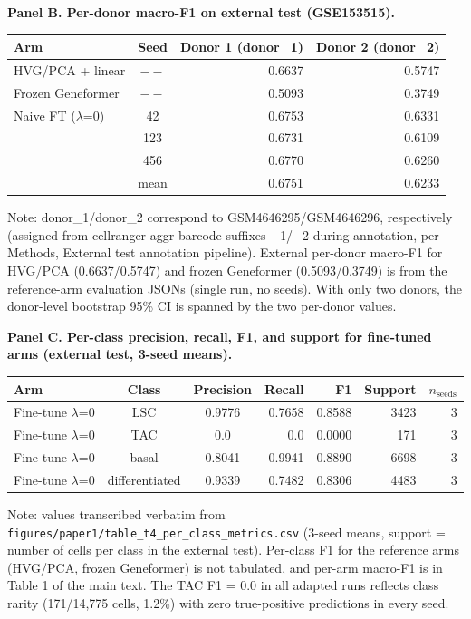 \documentclass[12pt,a4paper]{article}
\begin{document}
\textbf{Panel B. Per-donor macro-F1 on external test (GSE153515).}

\begingroup
\small
\begin{tabular}{lcrr}
\toprule
Arm & Seed & Donor 1 (donor\_1) & Donor 2 (donor\_2)\\
\midrule
HVG/PCA + linear & $--$ & 0.6637 & 0.5747\\
Frozen Geneformer & $--$ & 0.5093 & 0.3749\\
Naive FT ($\lambda$=0) & 42 & 0.6753 & 0.6331\\
 & 123 & 0.6731 & 0.6109\\
 & 456 & 0.6770 & 0.6260\\
 & mean & 0.6751 & 0.6233\\
\bottomrule
\end{tabular}
\endgroup

Note: donor\_1/donor\_2 correspond to GSM4646295/GSM4646296, respectively (assigned from cellranger aggr barcode suffixes $-$1/$-$2 during annotation, per Methods, External test annotation pipeline). External per-donor macro-F1 for HVG/PCA (0.6637/0.5747) and frozen Geneformer (0.5093/0.3749) is from the reference-arm evaluation JSONs (single run, no seeds). With only two donors, the donor-level bootstrap 95\% CI is spanned by the two per-donor values.

\textbf{Panel C. Per-class precision, recall, F1, and support for fine-tuned arms (external test, 3-seed means).}

\begingroup
\small
\begin{tabular}{lccrrrr}
\toprule
Arm & Class & Precision & Recall & F1 & Support & $n_{\mathrm{seeds}}$\\
\midrule
Fine-tune $\lambda$=0 & LSC & 0.9776 & 0.7658 & 0.8588 & 3423 & 3\\
Fine-tune $\lambda$=0 & TAC & 0.0 & 0.0 & 0.0000 & 171 & 3\\
Fine-tune $\lambda$=0 & basal & 0.8041 & 0.9941 & 0.8890 & 6698 & 3\\
Fine-tune $\lambda$=0 & differentiated & 0.9339 & 0.7482 & 0.8306 & 4483 & 3\\
\bottomrule
\end{tabular}
\endgroup

Note: values transcribed verbatim from \texttt{figures/paper1/table\_t4\_per\_class\_metrics.csv} (3-seed means, support = number of cells per class in the external test). Per-class F1 for the reference arms (HVG/PCA, frozen Geneformer) is not tabulated, and per-arm macro-F1 is in Table 1 of the main text. The TAC F1 = 0.0 in all adapted runs reflects class rarity (171/14,775 cells, 1.2\%) with zero true-positive predictions in every seed.
\end{document}

